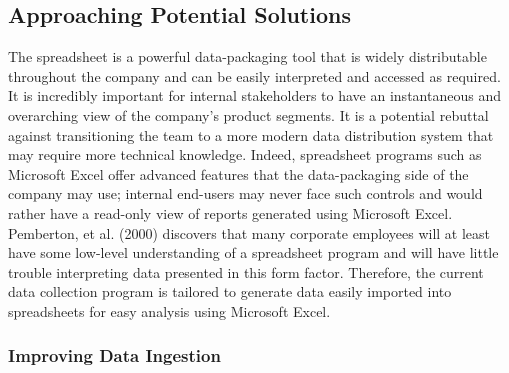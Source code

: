 \documentclass[12pt]{article}
\begin{document}
\subsection{Approaching Potential Solutions}

\indent\hspace{0.5in} The spreadsheet is a powerful data-packaging tool that is widely distributable throughout the company and can be easily interpreted and accessed as required. It is incredibly important for internal stakeholders to have an instantaneous and overarching view of the company's product segments. It is a potential rebuttal against transitioning the team to a more modern data distribution system that may require more technical knowledge. Indeed, spreadsheet programs such as Microsoft Excel offer advanced features that the data-packaging side of the company may use; internal end-users may never face such controls and would rather have a read-only view of reports generated using Microsoft Excel. Pemberton, et al. (2000) discovers that many corporate employees will at least have some low-level understanding of a spreadsheet program and will have little trouble interpreting data presented in this form factor. Therefore, the current data collection program is tailored to generate data easily imported into spreadsheets for easy analysis using Microsoft Excel.

\subsubsection{Improving Data Ingestion}
\end{document}
